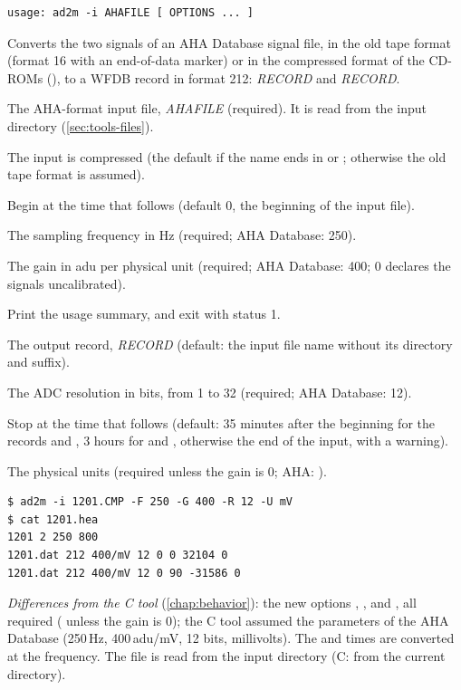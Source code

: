 \begin{lstlisting}[style=signature,language={}]
usage: ad2m -i AHAFILE [ OPTIONS ... ]
\end{lstlisting}
Converts the two signals of an AHA Database signal file, in the old tape format (format 16
with an end-of-data marker) or in the compressed format of the CD-ROMs (), to a
WFDB record in format 212: \textit{RECORD} and \textit{RECORD}.
\begin{params}
\item[-i] The AHA-format input file, \textit{AHAFILE} (required). It is read from the
  input directory (\cref{sec:tools-files}).
\item[-c] The input is compressed (the default if the name ends in  or
  ; otherwise the old tape format is assumed).
\item[-f] Begin at the time that follows (default 0, the beginning of the input file).
\item[-F] The sampling frequency in Hz (required; AHA Database: 250).
\item[-G] The gain in adu per physical unit (required; AHA Database: 400; 0 declares the
  signals uncalibrated).
\item[-h] Print the usage summary, and exit with status 1.
\item[-r] The output record, \textit{RECORD} (default: the input file name without its
  directory and suffix).
\item[-R] The ADC resolution in bits, from 1 to 32 (required; AHA Database: 12).
\item[-t] Stop at the time that follows (default: 35 minutes after the beginning for the
  records  and , 3 hours for  and , otherwise
  the end of the input, with a warning).
\item[-U] The physical units (required unless the gain is 0; AHA: ).
\end{params}
\begin{lstlisting}[style=text]
$ ad2m -i 1201.CMP -F 250 -G 400 -R 12 -U mV
$ cat 1201.hea
1201 2 250 800
1201.dat 212 400/mV 12 0 0 32104 0
1201.dat 212 400/mV 12 0 90 -31586 0
\end{lstlisting}
\textit{Differences from the C tool} (\cref{chap:behavior}): the new options ,
,  and , all required ( unless the gain is 0); the C tool
assumed the parameters of the AHA Database (250\,Hz, 400\,adu/mV, 12 bits, millivolts).
The  and  times are converted at the  frequency. The  file
is read from the input directory (C: from the current directory).

